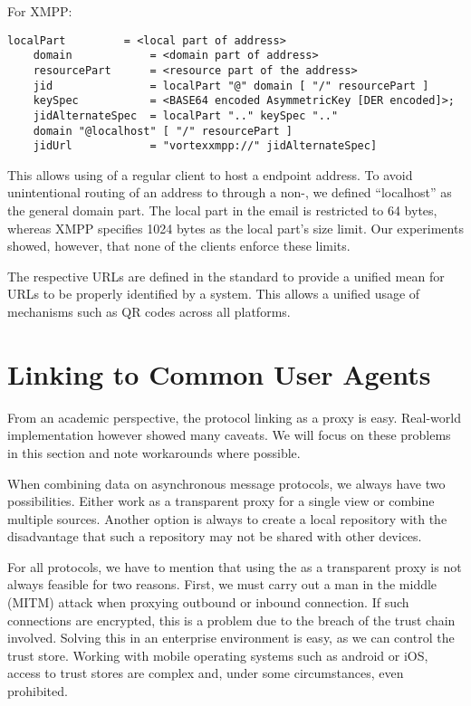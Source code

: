 For XMPP:
\begin{lstlisting}[language=EBNF]
	localPart         = <local part of address>
	domain            = <domain part of address>
	resourcePart      = <resource part of the address>
	jid               = localPart "@" domain [ "/" resourcePart ]
	keySpec           = <BASE64 encoded AsymmetricKey [DER encoded]>;
	jidAlternateSpec  = localPart ".." keySpec ".." 
	domain "@localhost" [ "/" resourcePart ]
	jidUrl            = "vortexxmpp://" jidAlternateSpec]
\end{lstlisting}

This allows using of a regular client to host a \VortexMessage{} endpoint address. To avoid unintentional routing of an address to through a non-\VortexNode{}, we defined ``localhost'' as the general domain part. The local part in the email is restricted to 64 bytes, whereas XMPP specifies 1024 bytes as the local part's size limit. Our experiments showed, however, that none of the clients enforce these limits.

The respective URLs are defined in the standard to provide a unified mean for URLs to be properly identified by a system. This allows a unified usage of mechanisms such as QR codes across all platforms.

\section{Linking to Common User Agents}
From an academic perspective, the protocol linking as a proxy is easy. Real-world implementation however showed many caveats. We will focus on these problems in this section and note workarounds where possible.

When combining data on asynchronous message protocols, we always have two possibilities. Either work as a transparent proxy for a single view or combine multiple sources. Another option is always to create a local repository with the disadvantage that such a repository may not be shared with other devices.

For all protocols, we have to mention that using the \VortexNode{} as a transparent proxy is not always feasible for two reasons. First, we must carry out a man in the middle (MITM) attack when proxying outbound or inbound connection. If such connections are encrypted, this is a problem due to the breach of the trust chain involved. Solving this in an enterprise environment is easy, as we can control the trust store. Working with mobile operating systems such as android or iOS, access to trust stores are complex and, under some circumstances, even prohibited.

